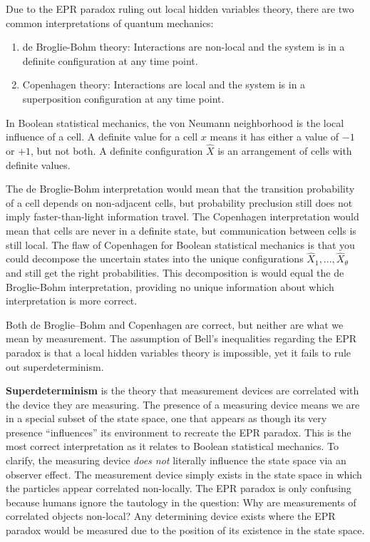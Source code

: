 \documentclass[10pt, a5paper, twoside, openright]{memoir}
\begin{document}
Due to the EPR paradox ruling out local hidden variables theory, there are two common interpretations of quantum mechanics:
\begin{enumerate}
\item de Broglie-Bohm theory: Interactions are non-local and the system is in a definite configuration at any time point.
\item Copenhagen theory: Interactions are local and the system is in a superposition configuration at any time point.
\end{enumerate}
In Boolean statistical mechanics, the von Neumann neighborhood is the local influence of a cell. A definite value for a cell $x$ means it has either a value of $-1$ or $+1$, but not both. A definite configuration $\hat X$ is an arrangement of cells with definite values.

The de Broglie-Bohm interpretation would mean that the transition probability of a cell depends on non-adjacent cells, but probability preclusion still does not imply faster-than-light information travel. The Copenhagen interpretation would mean that cells are never in a definite state, but communication between cells is still local. The flaw of Copenhagen for Boolean statistical mechanics is that you could decompose the uncertain states into the unique configurations $\hat X_1,...,\hat X_\theta$ and still get the right probabilities. This decomposition is would equal the de Broglie-Bohm interpretation, providing no unique information about which interpretation is more correct. 

Both de Broglie–Bohm and Copenhagen are correct, but neither are what we mean by measurement. The assumption of Bell's inequalities regarding the EPR paradox is that a local hidden variables theory is impossible, yet it fails to rule out superdeterminism. 

\textbf{Superdeterminism} is the theory that measurement devices are correlated with the device they are measuring. The presence of a measuring device means we are in a special subset of the state space, one that appears as though its very presence ``influences'' its environment to recreate the EPR paradox. This is the most correct interpretation as it relates to Boolean statistical mechanics. To clarify, the measuring device \textit{does not} literally influence the state space via an observer effect. The measurement device simply exists in the state space in which the particles appear correlated non-locally. The EPR paradox is only confusing because humans ignore the tautology in the question: Why are measurements of correlated objects non-local? Any determining device exists where the EPR paradox would be measured due to the position of its existence in the state space.
\end{document}
